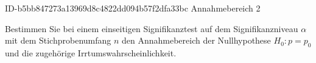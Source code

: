 \begin{exercise}
      {ID-b5bb847273a13969d8c4822dd094b57f2dfa33bc}
      {Annahmebereich 2}
  \ifproblem\problem\par
    Bestimmen Sie bei einem einseitigen Signifikanztest auf dem Signifikanzniveau
    $\alpha$ mit dem Stichprobenumfang $n$ den Annahmebereich der Nullhypothese
    $H_0:p=p_0$ und die zugehörige Irrtumswahrscheinlichkeit.
    \begin{center}
      \qquad
      \qquad
      \\[1ex]
      \qquad
      \qquad
      \qquad
    \end{center}
  \fi
\end{exercise}

